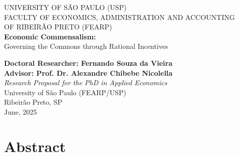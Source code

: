 \documentclass[a4paper,12pt,oneside,brazil,english,nottoc,notbib]{abntex2}
\newcommand{\listabstractname}{Abstract}
\newcommand{\addabstracttoc}{%
  \addcontentsline{toc}{section}{\protect\numberline{}\listabstractname}%
}
\renewcommand{\thesection}{\arabic{section}.}
\begin{document}
\begin{titlepage}
    \centering
    {\large UNIVERSITY OF S\~AO PAULO (USP)\\[0.2cm]
    FACULTY OF ECONOMICS, ADMINISTRATION AND ACCOUNTING\\
    OF RIBEIR\~AO PRETO (FEARP)}\\[3.5cm]

    {\Huge \bfseries Economic Commensalism:}\\[0.3cm]
    {\LARGE Governing the Commons through Rational Incentives}

    \vspace{1.5cm}

    {\large \textbf{Doctoral Researcher: Fernando Souza da Vieira}}\\[0.3cm]
    {\large \textbf{Advisor: Prof. Dr. Alexandre Chibebe Nicolella}}\\[2cm]

    \textit{Research Proposal for the PhD in Applied Economics}\\
    University of S\~ao Paulo (FEARP/USP)\\[2.5cm]

\vfill
{\large Ribeir\~ao Preto, SP}\\[0.3cm]
{\large June, 2025}

\end{titlepage}

\clearpage
\begingroup
{}
\renewcommand{\addcontentsline}[3]{}
\tableofcontents
\endgroup
\clearpage

\setcounter{page}{5}
\pagestyle{fancy}

\clearpage
\addabstracttoc
\section*{Abstract}


\clearpage
\thispagestyle{fancy}

\clearpage
\thispagestyle{fancy}

\clearpage
\thispagestyle{fancy}

\clearpage
\thispagestyle{fancy}


\clearpage
\appendix
\renewcommand{\thesection}{\Alph{section}.}
\thispagestyle{fancy}

\clearpage
\thispagestyle{fancy}


\clearpage


\end{document}
